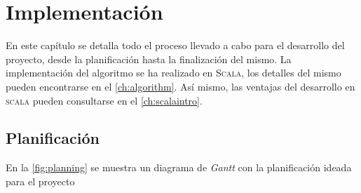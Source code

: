 \chapter{Implementación}
\label{ch:impl}

En este capítulo se detalla todo el proceso llevado a cabo para el desarrollo
del proyecto, desde la planificación hasta la finalización del mismo. La
implementación del algoritmo se ha realizado en \textsc{Scala}, los detalles del
mismo pueden encontrarse en el \autoref{ch:algorithm}. Así mismo, las ventajas
del desarrollo en \textsc{scala} pueden consultarse en el
\autoref{ch:scalaintro}.

\section{Planificación}
\label{sec:planning}

En la \autoref{fig:planning} se muestra un diagrama de \emph{Gantt} con la
planificación ideada para el proyecto

